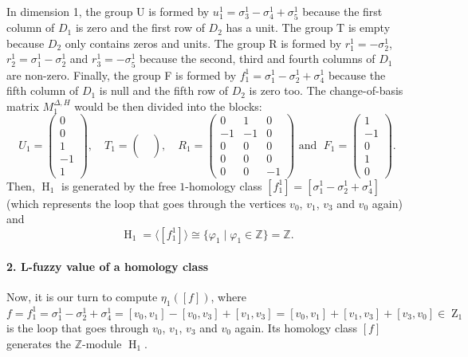 \documentclass[a4paper,10pt]{article}
\newcommand{\bbz}{\mathbb{Z}}
\DeclareMathOperator{\Zo}{Z}
\DeclareMathOperator{\Ho}{H}
\begin{document}
In dimension 1, the group U is formed by \(u^1_{1}=\sigma^1_{3}-\sigma^1_{4}+\sigma^1_{5}\) because the first column of \(D_1\) is zero and the first row of \(D_2\) has a unit. The group T is empty because \(D_2\) only contains zeros and units. The group R is formed by \(r^1_{1}=-\sigma^1_{2}\), \(r^1_{2}=\sigma^1_{1} - \sigma^1_{2}\) and \(r^1_{3}=-\sigma^1_{5}\) because the second, third and fourth columns of \(D_1\) are non-zero. Finally, the group F is formed by \(f^1_{1}=\sigma^1_{1}-\sigma^1_{2}+\sigma^1_{4}\) because the fifth column of \(D_1\) is null and the fifth row of \(D_2\) is zero too. The change-of-basis matrix \(M^{\Delta, H}_1\) would be then divided into the blocks:
\[
U_1=
\left(\begin{array}{r} 0 \\ 0 \\ 1 \\-1 \\ 1\end{array}\right),
\quad T_1=
\left(\begin{array}{r}\;\\\;\\\;\\\;\\\;\end{array}\right),
\quad R_1 = 
\left(
\begin{array}{rrr}
 0 &  1 &  0 \\
-1 & -1 &  0 \\
 0 &  0 &  0 \\
 0 &  0 &  0 \\
 0 &  0 &  -1 
\end{array}
\right)
\text{  and  } \;
F_1=
\left(\begin{array}{r} 1 \\-1 \\ 0 \\ 1 \\ 0\end{array}\right).
\]
Then, \(\Ho_1\) is generated by the free \(1\)-homology class \([f^{1}_{1}]=[\sigma^1_{1}-\sigma^1_{2}+\sigma^1_{4}]\) (which represents the loop that goes through the vertices \(v_0\), \(v_1\), \(v_3\) and \(v_0\) again) and
\[
\Ho_1 = \langle [f^1_1] \rangle \cong \{\varphi_1 \mid \varphi_1 \in \bbz\} = \bbz.
\]

\paragraph{2. L-fuzzy value of a homology class} Now, it is our turn to compute \(\eta_1([f])\), where 
\[
f = f^1_1 = \sigma^{1}_{1}-\sigma^{1}_{2}+\sigma^{1}_{4} = [v_0,v_1] - [v_0,v_3] + [v_1,v_3] =  [v_0,v_1]+[v_1,v_3]+[v_3,v_0] \in \Zo_1
\]
is the loop that goes through \(v_0\), \(v_1\), \(v_3\) and \(v_0\) again. Its homology class \([f]\) generates the \(\bbz\)-module \(\Ho_1\). 
\end{document}

